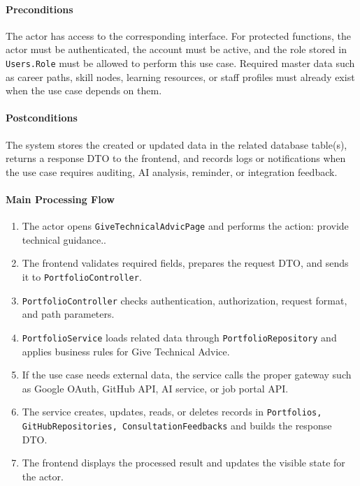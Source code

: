 \paragraph{Preconditions}

The actor has access to the corresponding interface. For protected functions, the actor must be authenticated, the account must be active, and the role stored in \texttt{Users.Role} must be allowed to perform this use case. Required master data such as career paths, skill nodes, learning resources, or staff profiles must already exist when the use case depends on them.

\paragraph{Postconditions}

The system stores the created or updated data in the related database table(s), returns a response DTO to the frontend, and records logs or notifications when the use case requires auditing, AI analysis, reminder, or integration feedback.

\paragraph{Main Processing Flow}

\begin{enumerate}
    \item The actor opens \texttt{GiveTechnicalAdvicPage} and performs the action: provide technical guidance..
    \item The frontend validates required fields, prepares the request DTO, and sends it to \texttt{PortfolioController}.
    \item \texttt{PortfolioController} checks authentication, authorization, request format, and path parameters.
    \item \texttt{PortfolioService} loads related data through \texttt{PortfolioRepository} and applies business rules for Give Technical Advice.
    \item If the use case needs external data, the service calls the proper gateway such as Google OAuth, GitHub API, AI service, or job portal API.
    \item The service creates, updates, reads, or deletes records in \texttt{Portfolios, GitHubRepositories, ConsultationFeedbacks} and builds the response DTO.
    \item The frontend displays the processed result and updates the visible state for the actor.
\end{enumerate}

